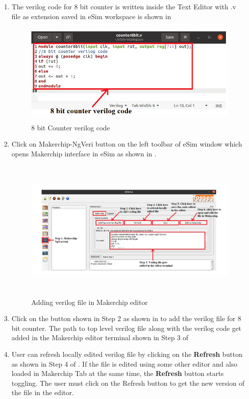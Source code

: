 \begin{enumerate}
\item The verilog code for 8 bit counter is written inside the Text Editor with .v file as extension saved in eSim workspace is shown in 

\begin{figure}[H]
\centering
\includegraphics[width = 11cm, height = 5cm]{./NgVeri/verilogcode.png}
\caption{8 bit Counter verilog code}
\label{vcode}
\end{figure}

\item Click on Makerchip-NgVeri button on the left toolbar of eSim window which opens Makerchip interface in eSim as shown in . 

\begin{figure}[H]
\centering
\includegraphics[width = 15cm, height =7cm]{./NgVeri/addingvfile.png}
\caption{Adding verilog file in Makerchip editor}
\label{addingv}
\end{figure}

\item Click on the button shown in Step 2 as shown in  to add the verilog file for 8 bit counter. The path to top level verilog file along with the verilog code get added in the Makerchip editor terminal shown in Step 3 of 

\item User can refresh locally edited verilog file by clicking on the \textbf{Refresh} button as shown in Step 4 of . If the file is edited using some other editor and also loaded in Makerchip Tab at the same time, the \textbf{Refresh} button starts toggling. The user must click on the Refresh button to get the new version of the file in the editor.


\end{enumerate}
